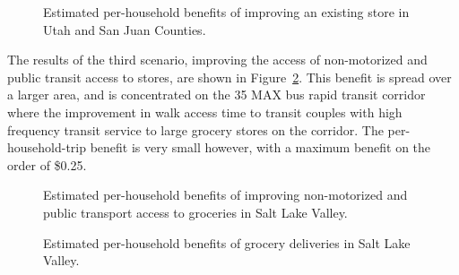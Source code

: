 \documentclass[
  letterpaper,
  number,
  review,
  3p]{elsarticle}
\begin{document}
\begin{figure}

\begin{minipage}{0.50\linewidth}



\end{minipage}%
%
\begin{minipage}{0.50\linewidth}



\end{minipage}%

\caption{\label{fig-s2sjut}Estimated per-household benefits of improving
an existing store in Utah and San Juan Counties.}

\end{figure}%

The results of the third scenario, improving the access of non-motorized
and public transit access to stores, are shown in
Figure~\ref{fig-s3results}. This benefit is spread over a larger area,
and is concentrated on the 35 MAX bus rapid transit corridor where the
improvement in walk access time to transit couples with high frequency
transit service to large grocery stores on the corridor. The
per-household-trip benefit is very small however, with a maximum benefit
on the order of \$0.25.

\begin{figure}


\caption{\label{fig-s3results}Estimated per-household benefits of
improving non-motorized and public transport access to groceries in Salt
Lake Valley.}

\end{figure}%

\begin{figure}


\caption{\label{fig-s4results}Estimated per-household benefits of
grocery deliveries in Salt Lake Valley.}

\end{figure}%
\end{document}
